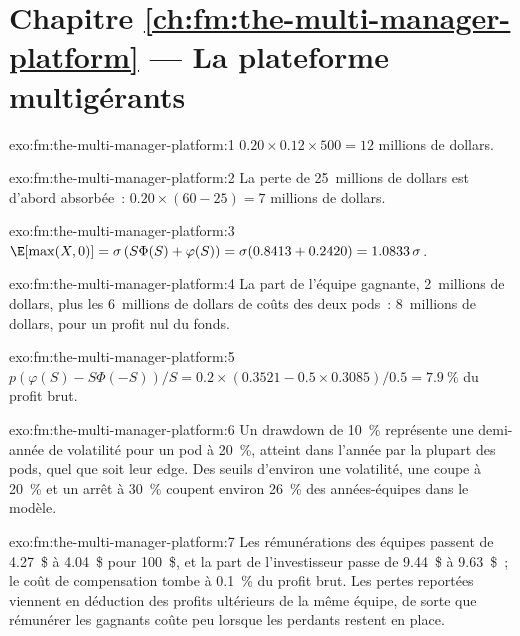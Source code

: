 \section*{Chapitre \ref{ch:fm:the-multi-manager-platform} --- La plateforme multigérants}

\begin{solution}{exo:fm:the-multi-manager-platform:1}
$0.20\times0.12\times500=12$ millions de dollars.
\end{solution}

\begin{solution}{exo:fm:the-multi-manager-platform:2}
La perte de 25~millions de dollars est d'abord absorbée~: $0.20\times(60-25)=7$ millions de dollars.
\end{solution}

\begin{solution}{exo:fm:the-multi-manager-platform:3}
$\E[\max(X,0)]=\sigma\,(S\Phi(S)+\varphi(S))=\sigma(0.8413+0.2420)=1.0833\,\sigma$.
\end{solution}

\begin{solution}{exo:fm:the-multi-manager-platform:4}
La part de l'équipe gagnante, 2~millions de dollars, plus les 6~millions de dollars de coûts des deux pods~: 8~millions de dollars, pour un profit nul du fonds.
\end{solution}

\begin{solution}{exo:fm:the-multi-manager-platform:5}
$p(\varphi(S)-S\Phi(-S))/S=0.2\times(0.3521-0.5\times0.3085)/0.5=7.9~\%$ du profit brut.
\end{solution}

\begin{solution}{exo:fm:the-multi-manager-platform:6}
Un drawdown de 10~\% représente une demi-année de volatilité pour un pod à 20~\%, atteint dans l'année par la plupart des pods, quel que soit leur edge. Des seuils d'environ une
volatilité, une coupe à 20~\% et un arrêt à 30~\% coupent environ 26~\% des années-équipes dans le modèle.
\end{solution}

\begin{solution}{exo:fm:the-multi-manager-platform:7}
Les rémunérations des équipes passent de 4.27~\$ à 4.04~\$ pour 100~\$, et la part de l'investisseur passe de 9.44~\$ à 9.63~\$~; le coût de compensation tombe à 0.1~\%
du profit brut. Les pertes reportées viennent en déduction des profits ultérieurs de la même équipe, de sorte que rémunérer les gagnants coûte peu lorsque les perdants restent en place.
\end{solution}

